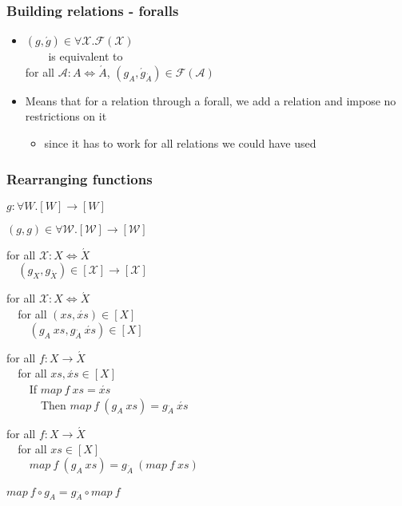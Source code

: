 \documentclass{beamer}
\begin{document}
\begin{frame}[fragile]
    \frametitle{Building relations - foralls}

\begin{itemize}
    \item 
        $(g,\acute{g}) \in \forall \mathcal{X}. \mathcal{F}(\mathcal{X})$ \\
        \verb?    ?is equivalent to\\
        for all $\mathcal{A} : A \Leftrightarrow \acute{A}$, $(g_A, \acute{g}_{\acute{A}}) \in \mathcal{F}(\mathcal{A})$
    \item Means that for a relation through a forall, we add a relation and impose no restrictions on it 
    \begin{itemize}
        \item since it has to work for all relations we could have used
    \end{itemize}
\end{itemize}

\end{frame}

\begin{frame}[fragile,t]
    \frametitle{Rearranging functions}

\begin{overprint}    

$g : \forall W. [W] \rightarrow [W]$

$(g,g) \in \forall \mathcal{W}. [\mathcal{W}] \rightarrow [\mathcal{W}]$

for all $\mathcal{X} : X \Leftrightarrow \acute{X}$\\
\verb?  ?$(g_X, g_{\acute{X}}) \in [\mathcal{X}] \rightarrow [\mathcal{X}]$

for all $\mathcal{X} : X \Leftrightarrow \acute{X}$\\
\verb?  ?for all $(xs, \acute{xs}) \in [X]$\\
\verb?    ?$(g_A\ xs, g_{\acute{A}}\ \acute{xs}) \in [X]$

for all $f : X \rightarrow \acute{X}$\\
\verb?  ?for all $xs, \acute{xs} \in [X]$\\
\verb?    ?If $map\ f\ xs = \acute{xs}$\\
\verb?      ?Then $map\ f\ (g_A\ xs) = g_{\acute{A}}\ \acute{xs}$

for all $f : X \rightarrow \acute{X}$\\
\verb?  ?for all $xs \in [X]$\\
\verb?    ?$map\ f\ (g_A\ xs) = g_{\acute{A}}\ (map\ f\ xs)$\\
\verb? ?\\
$map\ f \circ g_A = g_{\acute{A}} \circ map\ f$

\end{overprint}

\end{frame}
\end{document}
